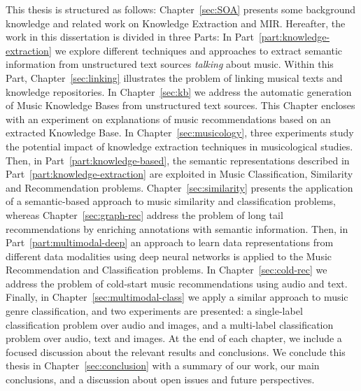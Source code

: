 This thesis is structured as follows: Chapter~\ref{sec:SOA} presents some background knowledge and related work on Knowledge Extraction and MIR. Hereafter, the work in this dissertation is divided in three Parts: In Part~\ref{part:knowledge-extraction} we explore different techniques and approaches to extract semantic information from unstructured text sources \textit{talking} about music. Within this Part, Chapter~\ref{sec:linking} illustrates the problem of linking musical texts and knowledge repositories. In Chapter~\ref{sec:kb} we address the automatic generation of Music Knowledge Bases from unstructured text sources. This Chapter encloses with an experiment on explanations of music recommendations based on an extracted Knowledge Base. In Chapter~\ref{sec:musicology}, three experiments study the potential impact of knowledge extraction techniques in musicological studies.
Then, in Part~\ref{part:knowledge-based}, the semantic representations described in Part~\ref{part:knowledge-extraction} are exploited in Music Classification, Similarity and Recommendation problems. Chapter~\ref{sec:similarity} presents the application of a semantic-based approach to music similarity and classification problems, whereas Chapter~\ref{sec:graph-rec} address the problem of long tail recommendations by enriching annotations with semantic information.
Then, in Part~\ref{part:multimodal-deep} an approach to learn data representations from different data modalities using deep neural networks is applied to the Music Recommendation and Classification problems. In Chapter~\ref{sec:cold-rec} we address the problem of cold-start music recommendations using audio and text. Finally, in Chapter~\ref{sec:multimodal-class} we apply a similar approach to music genre classification, and two experiments are presented: a single-label classification problem over audio and images, and a multi-label classification problem over audio, text and images.
At the end of each chapter, we include a focused discussion about the relevant results and conclusions. We conclude this thesis in Chapter~\ref{sec:conclusion} with a summary of our work, our main conclusions, and a discussion about open issues and future perspectives.




